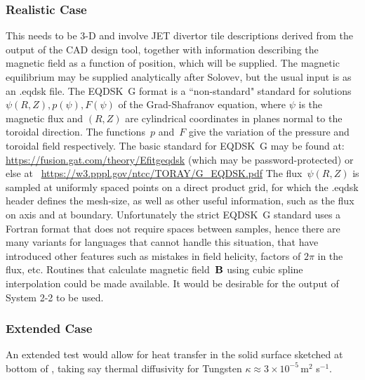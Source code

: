 \subsubsection{Realistic Case}\label{sec:realistic}
This needs to be 3-D and involve JET divertor tile descriptions derived from
the output of the CAD design tool, together with information
describing the magnetic field as a function of position, which will be supplied.
The magnetic equilibrium may be supplied analytically after Solovev, but the
usual input is as an .eqdsk file.
The EQDSK~G format is a ``non-standard" standard for
solutions $\psi(R,Z), p(\psi), F(\psi)$ of the Grad-Shafranov equation, where
$\psi$ is the magnetic flux and $(R,Z)$ are cylindrical coordinates
in planes normal to the toroidal direction. The functions~$p$ and~$F$ give the
variation of the pressure and toroidal field respectively.
The basic standard for EQDSK~G may be found at:
\url{https://fusion.gat.com/theory/Efitgeqdsk} (which may be password-protected)
or else at ~\url{https://w3.pppl.gov/ntcc/TORAY/G_EQDSK.pdf}
The flux~$\psi(R,Z)$ is sampled at uniformly spaced points on a direct product grid,
for which the .eqdsk header defines the mesh-size, as well as other useful
information, such as the flux on axis and at boundary.
Unfortunately the strict EQDSK~G standard uses a Fortran format that does
not require spaces between samples, hence there are many variants for
languages that cannot handle this situation, that have introduced other
features such as mistakes in field helicity, factors of $2\pi$ in the flux, etc.
Routines that calculate magnetic field~${\bf B}$ using cubic spline interpolation
could be made available. It would be desirable for the output of System 2-2
to be used.


\subsubsection{Extended Case}\label{sec:extended}
An extended test would allow for heat transfer in the solid surface sketched 
at bottom of , taking say thermal diffusivity for Tungsten
$\kappa \approx 3 \times 10^{-5}$\,m$^2$ s$^{-1}$. 
